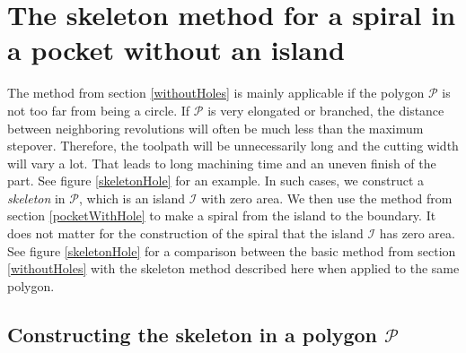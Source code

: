\documentclass[3p]{elsarticle}
\newcommand{\VD}{\mathcal{VD}}
\newcommand{\PP}{\mathcal{P}}
\newcommand{\HH}{\mathcal{I}}
\newcommand{\CC}{\mathcal{C}}
\begin{document}
\section{The skeleton method for a spiral in a pocket without an island}\label{skeletonMethod}

\begin{figure*}
\centering
{}\quad
{}
\caption{
Comparison of the basic spiral method from section \ref{withoutHoles}, figure ,
with the improved skeleton method from section \ref{skeletonMethod}, figure .
Note that the spiral obtained from the skeleton method is significantly shorter and that the distance between
neighboring revolutions is varying much less than when using the basic method.
}
\label{skeletonHole}
\end{figure*}

The method from section \ref{withoutHoles} is mainly applicable
if the polygon $\PP$ is not too far from being a circle. If $\PP$ is very elongated or branched,
the distance between neighboring revolutions will often be much less
than the maximum stepover. Therefore, the toolpath will be unnecessarily long and the cutting width will
vary a lot. That leads to long machining time and an uneven finish of the part.
See figure \ref{skeletonHole} for an example.
In such cases, we construct a \emph{skeleton} in $\PP$,
which is an island $\HH$ with zero area.
We then use the method from section \ref{pocketWithHole} to make a spiral from the island to the boundary.
It does not matter for the construction of the spiral that the island $\HH$ has zero area.
See figure \ref{skeletonHole} for a comparison between the basic method from
section \ref{withoutHoles} with the skeleton method described here when applied to the same
polygon.

\subsection{Constructing the skeleton in a polygon $\PP$}

\begin{figure*}
\centering
{}\quad
{}
\caption{
 The diagram $\VD(\PP)$ of the polygon $\PP$ from figure \ref{skeletonHole} in green,
where the edges chosen for the skeleton are black.  The diagram
$\VD(\PP\setminus\HH)$ of
$\PP$ with the skeleton considered an island $\HH$. The cycle $\CC$ is blue and the remaining edges are green.
The resulting spiral from figure \ref{spiralSkeletonHole} is included in gray.
}
\label{skeletonConstruction}
\end{figure*}
\end{document}
